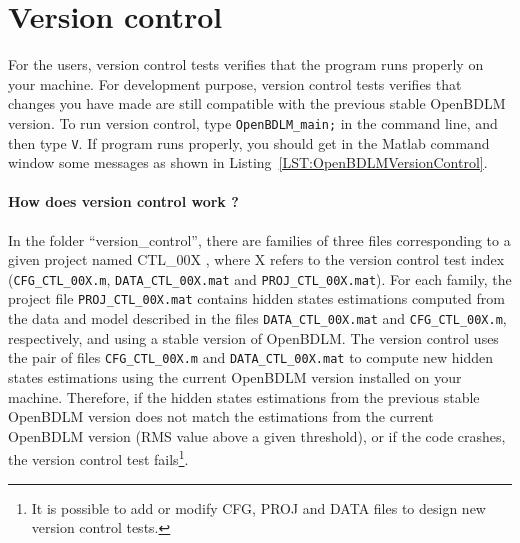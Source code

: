 \section{Version control}
\label{S:VERSIONCONTROL}

For the users, version control tests verifies that the program runs properly on your machine. 
For development purpose, version control tests verifies that changes you have made are still compatible with the previous stable OpenBDLM version. 
To run version control, type \colorbox{light-gray}{\lstinline[basicstyle = \mlttfamily \small, backgroundcolor = \color{light-gray}]!OpenBDLM_main;!} in the \MATLAB{} command line, and then type \colorbox{light-gray}{\lstinline[basicstyle = \mlttfamily \small, backgroundcolor = \color{light-gray}]!V!}. 
If program runs properly, you should get in the Matlab command window some messages as shown in Listing~\ref{LST:OpenBDLMVersionControl}.

\paragraph{How does version control work ?}
In the folder ``version\_control'', there are families of three files corresponding to a given project named CTL\_00X , where X refers to the version control test index (\lstinline[basicstyle = \mlttfamily \small, backgroundcolor = \color{light-gray}]!CFG_CTL_00X.m!, \lstinline[basicstyle = \mlttfamily \small, backgroundcolor = \color{light-gray}]!DATA_CTL_00X.mat! and \lstinline[basicstyle = \mlttfamily \small, backgroundcolor = \color{light-gray}]!PROJ_CTL_00X.mat!).
For each family, the project file \lstinline[basicstyle = \mlttfamily \small, backgroundcolor = \color{light-gray}]!PROJ_CTL_00X.mat! contains hidden states estimations computed from the data and model described in the files \lstinline[basicstyle = \mlttfamily \small, backgroundcolor = \color{light-gray}]!DATA_CTL_00X.mat! and \lstinline[basicstyle = \mlttfamily \small, backgroundcolor = \color{light-gray}]!CFG_CTL_00X.m!, respectively, and using a stable version of OpenBDLM.
The version control uses the pair of files \lstinline[basicstyle = \mlttfamily \small, backgroundcolor = \color{light-gray}]!CFG_CTL_00X.m! and \lstinline[basicstyle = \mlttfamily \small, backgroundcolor = \color{light-gray}]!DATA_CTL_00X.mat! to compute new hidden states estimations using the current  OpenBDLM version installed on your machine.
Therefore, if the hidden states estimations from the previous stable OpenBDLM version does not match the estimations from the current OpenBDLM version (RMS value above a given threshold), or if the code crashes, the version control test fails\footnote{It is possible to add or modify CFG, PROJ and DATA files to design new version control tests.}.

